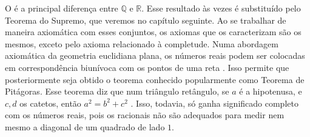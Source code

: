 \documentclass[../main.tex]{subfiles}
\begin{document}
O  é a principal diferença entre $\mathbb{Q}$ e $\mathbb{R}$. Esse resultado às vezes é substituído pelo Teorema do Supremo, que veremos no capítulo seguinte. Ao se trabalhar de maneira axiomática com esses conjuntos, os axiomas que os caracterizam são os mesmos, exceto pelo axioma relacionado à completude. Numa abordagem axiomática da geometria euclidiana plana, os números reais podem ser colocadas em correspondência biunívoca com os pontos de uma reta \cite[p. 16]{barbosa}. Isso permite que posteriormente seja obtido o teorema conhecido popularmente como Teorema de Pitágoras. Esse teorema diz que num triângulo retângulo, se $a$ é a hipotenusa, e $c,d$ os catetos, então $a^2 = b^2 + c^2$ \cite[p. 133]{barbosa}. Isso, todavia, só ganha significado completo com os números reais, pois os racionais não são adequados para medir nem mesmo a diagonal de um quadrado de lado $1$. 
\end{document}

